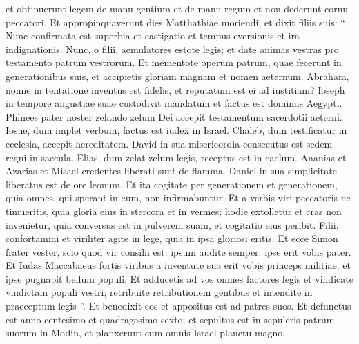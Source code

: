 \begin{biblechapter}
\begin{biblechapter}
\verse et obtinuerunt legem de manu gentium et de manu regum et non dederunt cornu peccatori.
 \verse Et appropinquaverunt dies Matthathiae moriendi, et dixit filiis suis: “ Nunc confirmata est superbia et castigatio et tempus eversionis et ira indignationis. 
 \verse Nunc, o filii, aemulatores estote legis; et date animas vestras pro testamento patrum vestrorum. 
\verse Et mementote operum patrum, quae fecerunt in generationibus suis, et accipietis gloriam magnam et nomen aeternum. 
\verse Abraham, nonne in tentatione inventus est fidelis, et reputatum est ei ad iustitiam? 
\verse Ioseph in tempore angustiae suae custodivit mandatum et factus est dominus Aegypti. 
\verse Phinees pater noster zelando zelum Dei accepit testamentum sacerdotii aeterni. 
\verse Iosue, dum implet verbum, factus est iudex in Israel. 
\verse Chaleb, dum testificatur in ecclesia, accepit hereditatem. 
\verse David in sua misericordia consecutus est sedem regni in saecula. 
\verse Elias, dum zelat zelum legis, receptus est in caelum. 
\verse Ananias et Azarias et Misael credentes liberati sunt de flamma. 
\verse Daniel in sua simplicitate liberatus est de ore leonum. 
\verse Et ita cogitate per generationem et generationem, quia omnes, qui sperant in eum, non infirmabuntur. 
 \verse Et a verbis viri peccatoris ne timueritis, quia gloria eius in stercora et in vermes; 
\verse hodie extolletur et cras non invenietur, quia conversus est in pulverem suam, et cogitatio eius peribit.
 \verse Filii, confortamini et viriliter agite in lege, quia in ipsa gloriosi eritis. 
\verse Et ecce Simon frater vester, scio quod vir consilii est: ipsum audite semper; ipse erit vobis pater. 
\verse Et Iudas Maccabaeus fortis viribus a iuventute sua erit vobis princeps militiae; et ipse pugnabit bellum populi. 
 \verse Et adducetis ad vos omnes factores legis et vindicate vindictam populi vestri; 
\verse retribuite retributionem gentibus et intendite in praeceptum legis ”.
 \verse Et benedixit eos et appositus est ad patres suos. 
\verse Et defunctus est anno centesimo et quadragesimo sexto; et sepultus est in sepulcris patrum suorum in Modin, et planxerunt eum omnis Israel planctu magno.
 

\end{biblechapter}
\end{biblechapter}
